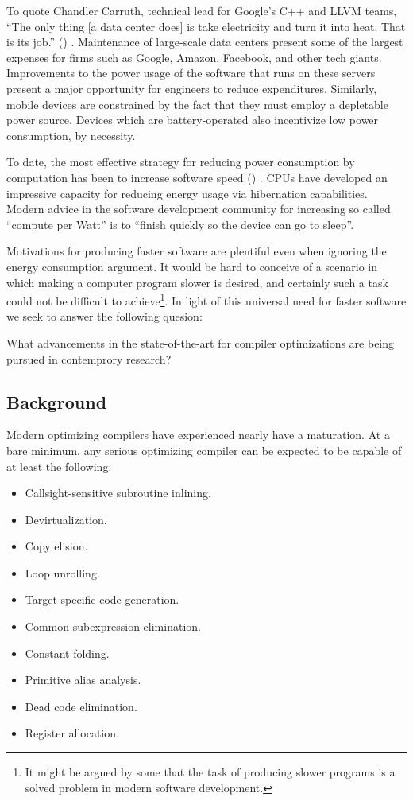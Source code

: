 \documentclass[nobib]{tufte-handout}
\newcommand{\placeholdertext}[1]{
	\noindent{\color{red}{#1}}
}
\newcommand{\CiteThis}{
({\color{red}{CITE THIS}})
}
\begin{document}
To quote Chandler Carruth, technical lead for Google's C++ and LLVM teams, ``The only thing [a data center does] is take electricity and turn it into heat.  That is its job.'' \CiteThis{}.  Maintenance of large-scale data centers present some of the largest expenses for firms such as Google, Amazon, Facebook, and other tech giants.  Improvements to the power usage of the software that runs on these servers present a major opportunity for engineers to reduce expenditures.  Similarly, mobile devices are constrained by the fact that they must employ a depletable power source.  Devices which are battery-operated also incentivize low power consumption, by necessity.

To date, the most effective strategy for reducing power consumption by computation has been to increase software speed \CiteThis{}.  CPUs have developed an impressive capacity for reducing energy usage via hibernation capabilities.  Modern advice in the software development community for increasing so called ``compute per Watt'' is to ``finish quickly so the device can go to sleep''.

Motivations for producing faster software are plentiful even when ignoring the energy consumption argument.  It would be hard to conceive of a scenario in which making a computer program slower is desired, and certainly such a task could not be difficult to achieve\footnote{It might be argued by some that the task of producing slower programs is a solved problem in modern software development.}.  In light of this universal need for faster software we seek to answer the following quesion:

\begin{displayquote}
What advancements in the state-of-the-art for compiler optimizations are being pursued in contemprory research?
\end{displayquote}




\subsection{Background}
\placeholdertext{Discuss fact that CPUs are super complex and compilers know it.}
Modern optimizing compilers have experienced nearly have a maturation.  At a bare minimum, any serious optimizing compiler can be expected to be capable of at least the following:
\begin{itemize}
\item Callsight-sensitive subroutine inlining.
\item Devirtualization. 
\item Copy elision.
\item Loop unrolling. 
\item Target-specific code generation.  
\item Common subexpression elimination.
\item Constant folding.
\item Primitive alias analysis. 
\item Dead code elimination.
\item Register allocation.
\end{itemize}
\end{document}
